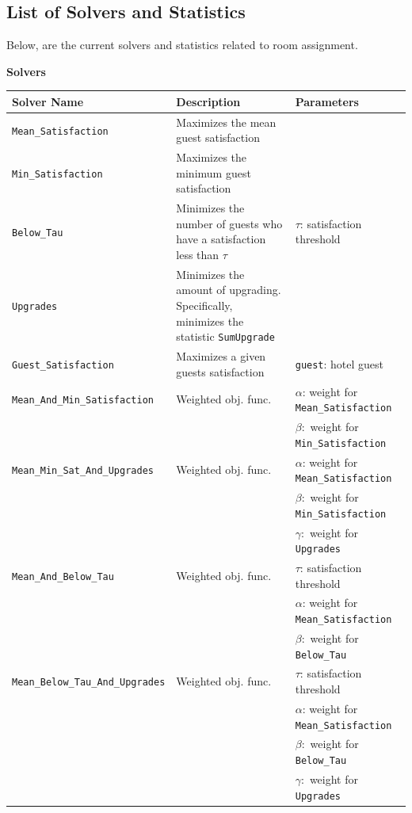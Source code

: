 \documentclass[11 pt]{article}
\begin{document}
\newpage

\subsection{List of Solvers and Statistics}

\par Below, are the current solvers and statistics related to room assignment.

\begin{center}
\textbf{Solvers} 
\end{center}
\begin{center}
\begin{tabular}{|l|p{4.4cm}|l|}
\hline
\textbf{Solver Name} & \textbf{Description} & \textbf{Parameters} \\
\hline
\texttt{Mean\_Satisfaction} & Maximizes the mean guest satisfaction &  \\
\hline
\texttt{Min\_Satisfaction} & Maximizes the minimum guest satisfaction &  \\
\hline
\texttt{Below\_Tau} & Minimizes the number of guests who have a satisfaction less than $\tau$ & $\tau$: satisfaction threshold  \\
\hline
\texttt{Upgrades} & Minimizes the amount of upgrading. Specifically, minimizes the statistic \texttt{SumUpgrade} & \\
\hline
\texttt{Guest\_Satisfaction} & Maximizes a given guests satisfaction & \texttt{guest}: hotel guest \\
\hline
\texttt{Mean\_And\_Min\_Satisfaction} & Weighted obj. func.  & $\alpha$: weight for \texttt{Mean\_Satisfaction} \\
& & $\beta:$ weight for \texttt{Min\_Satisfaction} \\
\hline
\texttt{Mean\_Min\_Sat\_And\_Upgrades} & Weighted obj. func.  & $\alpha$: weight for \texttt{Mean\_Satisfaction} \\
& & $\beta:$ weight for \texttt{Min\_Satisfaction} \\
& & $\gamma:$ weight for \texttt{Upgrades} \\
\hline
\texttt{Mean\_And\_Below\_Tau} & Weighted obj. func.  & $\tau$: satisfaction threshold \\
& & $\alpha$: weight for \texttt{Mean\_Satisfaction} \\
& & $\beta:$ weight for \texttt{Below\_Tau} \\
\hline
\texttt{Mean\_Below\_Tau\_And\_Upgrades} & Weighted obj. func.  & $\tau$: satisfaction threshold \\
& & $\alpha$: weight for \texttt{Mean\_Satisfaction} \\
& & $\beta:$ weight for \texttt{Below\_Tau} \\
& & $\gamma:$ weight for \texttt{Upgrades} \\
\hline
\end{tabular}
\end{center}
\end{document}
